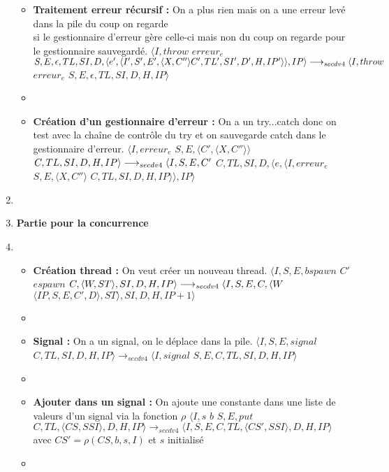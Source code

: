 \documentclass[10pt,a4paper]{article}
\begin{document}
\begin{enumerate}
\begin{itemize}
						\item[]  \textbf{Traitement erreur récursif :} On a plus rien mais on a une erreur levé dans la pile du coup on regarde 
						\\si le gestionnaire d'erreur gère celle-ci mais non du coup on regarde pour le gestionnaire sauvegardé.
						\smallbreak 
						$\langle I,throw$ $erreur_{e}$ $S,E,\epsilon,TL,SI,D,\langle e',\langle I',S',E',\langle X,C'' \rangle C',TL',SI',D',H,IP'\rangle\rangle,IP\rangle \\\longrightarrow_{secdv4}\langle I,throw$ $erreur_{e}$ $S,E,\epsilon,TL,SI,D,H,IP\rangle$
						\item[]  \newpage
						\item[]  \textbf{Création d'un gestionnaire d'erreur :} On a un try...catch donc on test avec la chaîne de contrôle du try et on sauvegarde catch dans le gestionnaire d'erreur.
						\smallbreak 
						$\langle I,erreur_{e}$ $S,E,\langle C',\langle X,C''\rangle\rangle$ $C,TL,SI,D,H,IP\rangle 
						\\\longrightarrow_{secdv4} \langle I,S,E,C'$ $C,TL,SI,D,\langle e,\langle I,erreur_{e}$ $S,E,\langle X,C'' \rangle$ $C,TL,SI,D,H,IP\rangle\rangle,IP\rangle$
					\end{itemize}
					\item[]
					\item[] \textbf{Partie pour la concurrence} 
					\item[]
					\begin{itemize}
						\item[]  \textbf{Création thread :} On veut créer un nouveau thread.
						\smallbreak $\langle I,S,E,bspawn$ $C'$ $espawn$ $C,\langle W,ST\rangle,SI,D,H,IP\rangle 
						\\\longrightarrow_{secdv4} \langle I,S,E,C,\langle W$ $\langle IP,S,E,C',D\rangle,ST\rangle,SI,D,H,IP+1\rangle$
						\item[]
						
						\item[]  \textbf{Signal :} On a un signal, on le déplace dans la pile.
						\smallbreak 
						$\langle I,S,E,signal$ $C,TL,SI,D,H,IP\rangle
						\longrightarrow_{secdv4} \langle I,signal$ $S,E,C,TL,SI,D,H,IP\rangle$
						\item[]
						
						\item[] \textbf{Ajouter dans un signal :} On ajoute une constante dans une liste de valeurs d'un signal via la fonction $\rho$
						\smallbreak
						$\langle I,s$ $b$ $S,E,put$ $C,TL,\langle CS,SSI\rangle,D,H,IP\rangle \longrightarrow_{secdv4} \langle I,S,E,C,TL,\langle CS',SSI\rangle,D,H,IP\rangle$ \\
						avec $CS' = \rho(CS,b,s,I)$ et $s$ initialisé
						\item[]
						

\end{itemize}
\end{enumerate}
\end{document}

